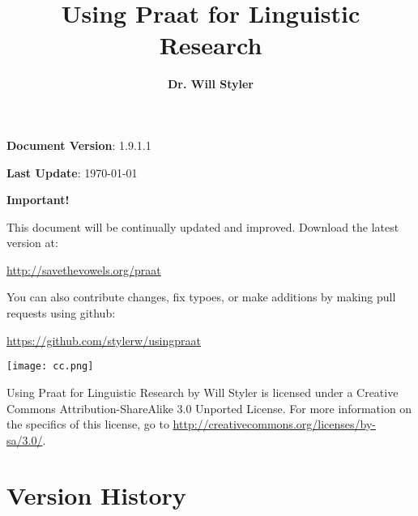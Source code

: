 \documentclass[11pt]{article}
\title{\textbf{Using Praat for Linguistic Research}}
\author{\textbf{Dr. Will Styler}}
\date{}                                           %
\begin{document}

\maketitle

\begin{center}
\vspace{0.5in}
\textbf{\small Document Version}: 1.9.1.1

\textbf{Last Update}: \today

\vspace{2.5in}

\textbf{Important!}

This document will be continually updated and improved.  Download the latest version at:

\url{http://savethevowels.org/praat}

You can also contribute changes, fix typoes, or make additions by making pull requests using github:

\url{https://github.com/stylerw/usingpraat}

\vspace{0.5in}

  \centerline{
    \mbox{\texttt{[image: cc.png]}}
  }

Using Praat for Linguistic Research by Will Styler is licensed under a Creative Commons Attribution-ShareAlike 3.0 Unported License.  For more information on the specifics of this license, go to \url{http://creativecommons.org/licenses/by-sa/3.0/}.

\end{center}

\pagebreak

\tableofcontents

\hypertarget{version-history}{%
\section{Version History}\label{version-history}}
\end{document}
